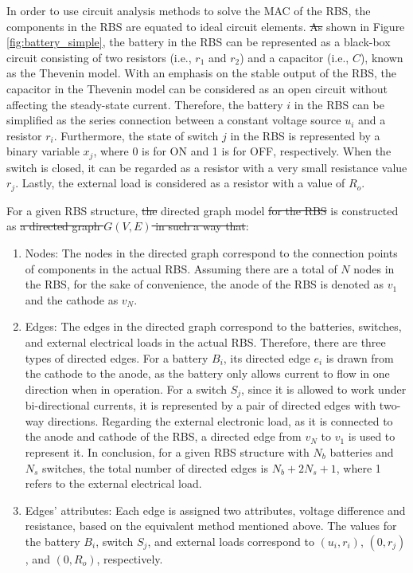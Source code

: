 \documentclass{article}
\providecommand{\DIFadd}[1]{{\protect\color{blue}\uwave{#1}}} %
\providecommand{\DIFdel}[1]{{\protect\color{red}\sout{#1}}}                      %
\providecommand{\DIFaddbegin}{} %
\providecommand{\DIFaddend}{} %
\providecommand{\DIFdelbegin}{} %
\providecommand{\DIFdelend}{} %
\newcommand{\DIFscaledelfig}{0.5}
\newlength{\DIFdelgraphicswidth} %
\newlength{\DIFdelgraphicsheight} %
\newcommand{\DIFaddincludegraphics}[2][]{{\color{blue}\fbox{\DIFOincludegraphics[#1]{#2}}}} %
\newcommand{\DIFdelincludegraphics}[2][]{%
\sbox{\DIFdelgraphicsbox}{\DIFOincludegraphics[#1]{#2}}%
\settoboxwidth{\DIFdelgraphicswidth}{\DIFdelgraphicsbox} %
\settoboxtotalheight{\DIFdelgraphicsheight}{\DIFdelgraphicsbox} %
\scalebox{\DIFscaledelfig}{%
\parbox[b]{\DIFdelgraphicswidth}{\usebox{\DIFdelgraphicsbox}\\[-\baselineskip] \rule{\DIFdelgraphicswidth}{0em}}\llap{\resizebox{\DIFdelgraphicswidth}{\DIFdelgraphicsheight}{%
\setlength{\unitlength}{\DIFdelgraphicswidth}%
\begin{picture}(1,1)%
\thicklines\linethickness{2pt} %
{\color[rgb]{1,0,0}\put(0,0){\framebox(1,1){}}}%
{\color[rgb]{1,0,0}\put(0,0){\line( 1,1){1}}}%
{\color[rgb]{1,0,0}\put(0,1){\line(1,-1){1}}}%
\end{picture}%
}\hspace*{3pt}}} %
} %
\DeclareRobustCommand{\DIFaddbegin}{\DIFOaddbegin \let\includegraphics\DIFaddincludegraphics} %
\DeclareRobustCommand{\DIFaddend}{\DIFOaddend \let\includegraphics\DIFOincludegraphics} %
\DeclareRobustCommand{\DIFdelbegin}{\DIFOdelbegin \let\includegraphics\DIFdelincludegraphics} %
\DeclareRobustCommand{\DIFdelend}{\DIFOaddend \let\includegraphics\DIFOincludegraphics} %
\begin{document}
In order to use circuit analysis methods to solve the MAC of the RBS, the components in the RBS are equated to ideal circuit elements.
\DIFdelbegin \DIFdel{As }\DIFdelend \DIFaddbegin \DIFadd{For instance, as }\DIFaddend shown in Figure \ref{fig:battery_simple}, the battery in the RBS can be represented as a black-box circuit consisting of two resistors (i.e., $r_1$ and $r_2$) and a capacitor (i.e., $C$), known as the Thevenin model\cite{hongwenheStateofChargeEstimationLithiumIon2011,mousavig.VariousBatteryModels2014}.
With an emphasis on the stable output of the RBS, the capacitor in the Thevenin model can be considered as an open circuit without affecting the steady-state current.
Therefore, the battery $i$ in the RBS can be simplified as the series connection between a constant voltage source $u_{i}$ and a resistor $r_{i}$.
Furthermore, the state of switch $j$ in the RBS is represented by a binary variable $x_j$, where 0 is for ON and 1 is for OFF, respectively.
When the switch is closed, it can be regarded as a resistor with a very small resistance value $r_{j}$.
Lastly, the external load is considered as a resistor with a value of $R_o$.


For a given RBS structure, \DIFdelbegin \DIFdel{the }\DIFdelend \DIFaddbegin \DIFadd{its }\DIFaddend directed graph model \DIFdelbegin \DIFdel{for the RBS }\DIFdelend \DIFaddbegin \DIFadd{$G(V,E)$ }\DIFaddend is constructed as \DIFdelbegin \DIFdel{a directed graph $G(V,E)$ in such a way that}\DIFdelend \DIFaddbegin \DIFadd{follows}\DIFaddend :
\begin{enumerate}
    \item Nodes:
        The nodes in the directed graph correspond to the connection points of components in the actual RBS. 
        Assuming there are a total of $N$ nodes in the RBS, for the sake of convenience, the anode of the RBS is denoted as $v_1$ and the cathode as $v_N$.
    \item Edges:
        The edges in the directed graph correspond to the batteries, switches, and external electrical loads in the actual RBS.
        Therefore, there are three types of directed edges. 
        For a battery $B_i$, its directed edge $e_i$ is drawn from the cathode to the anode, as the battery only allows current to flow in one direction when in operation.
        For a switch $S_j$, since it is allowed to work under bi-directional currents, it is represented by a pair of directed edges with two-way directions. 
        Regarding the external electronic load, as it is connected to the anode and cathode of the RBS, a directed edge from $v_N$ to $v_1$ is used to represent it. 
        In conclusion, for a given RBS structure with $N_b$ batteries and $N_s$ switches, the total number of directed edges is $N_b+2N_s+1$, where 1 refers to the external electrical load.
    \item Edges' attributes:
        Each edge is assigned two attributes, voltage difference and resistance, based on the equivalent method mentioned above.
        The values for the battery $B_i$, switch $S_j$, and external loads correspond to $(u_i, r_i)$, $(0, r_j)$, and $(0, R_o)$, respectively.
\end{enumerate}
\end{document}
